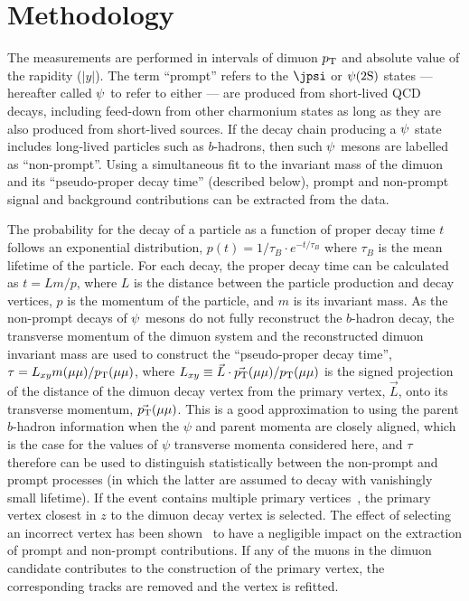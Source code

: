\section{Methodology}
\label{sec:method}

The measurements are performed in intervals of dimuon $\mbox{$p_{\text{T}}$}$ and absolute value of the rapidity ($|y|$). 
The term ``prompt'' refers to the $\jpsi$ or $\psi(2\mathrm{S})$ states --- hereafter called $\psi$ to refer to either --- are produced 
from short-lived QCD decays, including feed-down from other charmonium states as long as they are also produced
from short-lived sources. If the decay chain producing a $\psi$ state includes long-lived particles such as
$b$-hadrons, then such $\psi$ mesons are labelled as ``non-prompt''. Using a simultaneous fit to the invariant mass of the dimuon and its ``pseudo-proper decay time'' 
(described below), prompt and non-prompt signal and background contributions can be extracted from the data.


The probability for the decay of a particle as a function of proper decay time $t$ follows an exponential distribution, 
$p(t) =  1/\tau_{B}\cdot e^{-t/\tau_{B}}$ where $\tau_{B}$ is the mean lifetime of the particle. For each decay, the proper decay time 
can be calculated as $t = L m/p$,
where $L$ is the distance between the particle production and decay vertices, $p$ is the momentum of the particle, and $m$ is its invariant mass.
As the non-prompt decays of $\psi$ mesons do not fully reconstruct the $b$-hadron decay, the transverse momentum of the 
dimuon system and the reconstructed dimuon invariant mass are used to construct the
``pseudo-proper decay time'', $\tau = L_{xy} m(\mu\mu)/\mbox{$p_{\text{T}}$}(\mu\mu)$, where $L_{xy} \equiv \vec{L} \cdot \vec{\mbox{$p_{\text{T}}$}}(\mu\mu)/\mbox{$p_{\text{T}}$}(\mu\mu)$ 
is the signed projection of the distance of the dimuon decay vertex 
from the primary vertex, $\vec{L}$, onto its transverse momentum, $\vec{\mbox{$p_{\text{T}}$}}(\mu\mu)$.
This is a good approximation to using the parent $b$-hadron information when the $\psi$ and parent momenta are closely aligned, which is the case for the values of $\psi$
transverse momenta considered here, and  $\tau$
therefore can be used to distinguish statistically between the non-prompt and prompt processes (in which the latter are assumed to decay with vanishingly small lifetime).
If the event contains multiple primary vertices~\cite{ATLASdetector}, the primary vertex closest in $z$ to the dimuon decay vertex is selected.
The effect of selecting an incorrect vertex has been shown~\cite{BJpsiPhi} to have a negligible impact on the extraction of prompt and non-prompt contributions.
If any of the muons in the dimuon candidate contributes to the construction of the primary vertex, the corresponding tracks are removed and the vertex is refitted.


